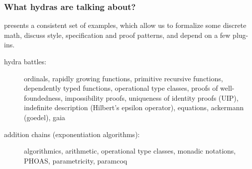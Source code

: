 \documentclass[10pt, fleqn]{beamer}
\begin{document}
\begin{frame}
  \frametitle{What hydras are talking about?}
  \begin{block}{}
    \Hydras presents a consistent set of examples, which allow us to formalize 
    some \textcolor{mathcolor}{discrete math}, discuss
    \textcolor{coqstylecolor}{\coq style, specification and proof patterns}, and depend on \textcolor{plugincolor}{a few plug-ins}.
  \end{block}
  \begin{block}{}
    \begin{description}
    \item[hydra battles:]
      
      \textcolor{mathcolor}{ordinals},
      \textcolor{mathcolor}{rapidly growing functions},
      \textcolor{mathcolor}{primitive recursive functions}, 
      \textcolor{coqstylecolor}{dependently typed functions},
      \textcolor{coqstylecolor}{operational type classes},
      \textcolor{coqstylecolor}{proofs of well-foundedness},
      \textcolor{coqstylecolor}{impossibility proofs},
      \textcolor{coqstylecolor}{uniqueness of identity proofs (UIP)},
      \textcolor{coqstylecolor}{indefinite description (Hilbert's epsilon operator)}, 
      \textcolor{plugincolor}{equations},
      \textcolor{plugincolor}{ackermann (goedel)},
      \textcolor{plugincolor}{gaia}
      
    \item[addition chains (exponentiation algorithms):]
      \textcolor{mathcolor}{algorithmics},
      \textcolor{mathcolor}{arithmetic},
      \textcolor{coqstylecolor}{operational type classes},
      \textcolor{coqstylecolor}{monadic notations},
      \textcolor{coqstylecolor}{PHOAS},
      \textcolor{coqstylecolor}{parametricity}, 
      \textcolor{plugincolor}{paramcoq}
    \end{description}
  \end{block}
\end{frame}
\end{document}
